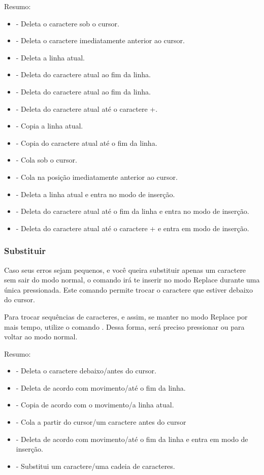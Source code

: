 Resumo:
\begin{itemize}
    \item {} - Deleta o caractere sob o cursor.
    \item {} - Deleta o caractere imediatamente anterior ao cursor.
    \item {} - Deleta a linha atual.
    \item {} - Deleta do caractere atual ao fim da linha.
    \item {} - Deleta do caractere atual ao fim da linha.
    \item {} - Deleta do caractere atual até o caractere +.
    \item {} - Copia a linha atual.
    \item {} - Copia do caractere atual até o fim da linha.
    \item {} - Cola sob o cursor.
    \item {} - Cola na posição imediatamente anterior ao cursor.
    \item {} - Deleta a linha atual e entra no modo de inserção.
    \item {} - Deleta do caractere atual até o fim da linha e entra no modo de inserção.
    \item {} - Deleta do caractere atual até o caractere + e entra em modo de inserção.
\end{itemize}


\subsubsection{Substituir}
Caso seus erros sejam pequenos, e você queira substituir apenas um caractere sem sair do modo normal,
o comando  irá te inserir no modo Replace durante uma única pressionada.
Este comando permite trocar o caractere que estiver debaixo do cursor.

Para trocar sequências de caracteres, e assim, se manter no modo Replace por mais tempo, utilize o comando .
Dessa forma, será preciso pressionar  ou  para voltar ao modo normal.

Resumo:
\begin{itemize}
    \item {} - Deleta o caractere debaixo/antes do cursor.
    \item {} - Deleta de acordo com movimento/até o fim da linha.
    \item {} - Copia de acordo com o movimento/a linha atual.
    \item {} - Cola a partir do cursor/um caractere antes do cursor
    \item {} - Deleta de acordo com movimento/até o fim da linha e entra em modo de inserção.
    \item {} - Substitui um caractere/uma cadeia de caracteres.
\end{itemize}

